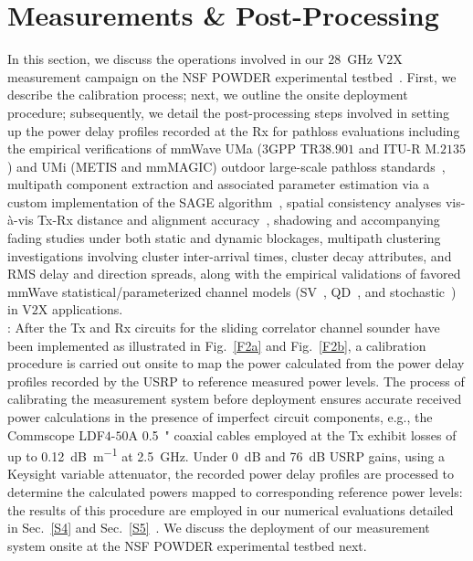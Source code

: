\documentclass[10pt, twocolumn]{IEEEtran}
\begin{document}
\vspace{-8mm}

\section{Measurements \& Post-Processing}\label{S3}
In this section, we discuss the operations involved in our \SI{28}{\giga\hertz} V$2$X measurement campaign on the NSF POWDER experimental testbed~\cite{POWDER}. First, we describe the calibration process; next, we outline the onsite deployment procedure; subsequently, we detail the post-processing steps involved in setting up the power delay profiles recorded at the Rx for pathloss evaluations including the empirical verifications of mmWave UMa ($3$GPP TR$38.901$ and ITU-R M$.2135$) and UMi (METIS and mmMAGIC) outdoor large-scale pathloss standards~\cite{MacCartneyModelsOverview}, multipath component extraction and associated parameter estimation via a custom implementation of the SAGE algorithm~\cite{SAGE}, spatial consistency analyses vis-\`{a}-vis Tx-Rx distance and alignment accuracy~\cite{SpatialConsistencyOriginal}, shadowing and accompanying fading studies under both static and dynamic blockages, multipath clustering investigations involving cluster inter-arrival times, cluster decay attributes, and RMS delay and direction spreads, along with the  empirical validations of favored mmWave statistical/parameterized channel models (SV~\cite{SV_Molisch}, QD~\cite{QDC_NIST}, and stochastic~\cite{Indoor60G}) in V$2$X applications.\\
: After the Tx and Rx circuits for the sliding correlator channel sounder have been implemented as illustrated in Fig.~\ref{F2a} and Fig.~\ref{F2b}, a calibration procedure is carried out onsite to map the power calculated from the power delay profiles recorded by the USRP to reference measured power levels. The process of calibrating the measurement system before deployment ensures accurate received power calculations in the presence of imperfect circuit components, e.g., the Commscope LDF$4$-$50$A \SI{0.5}{{"}} coaxial cables employed at the Tx exhibit losses of up to \SI{0.12}{\deci\bel\per\meter} at \SI{2.5}{\giga\hertz}. Under \SI{0}{\deci\bel} and \SI{76}{\deci\bel} USRP gains, using a Keysight variable attenuator, the recorded power delay profiles are processed to determine the calculated powers mapped to corresponding reference power levels: the results of this procedure are employed in our numerical evaluations detailed in Sec.~\ref{S4} and Sec.~\ref{S5}~\cite{SPAVE_ICC}. We discuss the deployment of our measurement system onsite at the NSF POWDER experimental testbed next.\\
\end{document}

